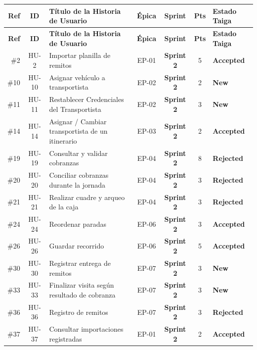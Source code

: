 \documentclass[a4paper,9pt]{article}
\begin{document}
\scriptsize
\begin{longtable}{r c p{8.2cm} c c c l}
\toprule
\textbf{Ref} & \textbf{ID} & \textbf{Título de la Historia de Usuario} & \textbf{Épica} & \textbf{Sprint} & \textbf{Pts} & \textbf{Estado Taiga} \\
\midrule
\endfirsthead
\toprule
\textbf{Ref} & \textbf{ID} & \textbf{Título de la Historia de Usuario} & \textbf{Épica} & \textbf{Sprint} & \textbf{Pts} & \textbf{Estado Taiga} \\
\midrule
\endhead
\bottomrule
\endfoot
\#2 & HU-2 & Importar planilla de remitos & EP-01 & \textbf{Sprint 2} & 5 & \textcolor{tealstatus}{\textbf{Accepted}} \\
\#10 & HU-10 & Asignar vehículo a transportista & EP-02 & \textbf{Sprint 2} & 2 & \textcolor{bluestatus}{\textbf{New}} \\
\#11 & HU-11 & Restablecer Credenciales del Transportista & EP-02 & \textbf{Sprint 2} & 3 & \textcolor{bluestatus}{\textbf{New}} \\
\#14 & HU-14 & Asignar / Cambiar transportista de un itinerario & EP-03 & \textbf{Sprint 2} & 2 & \textcolor{tealstatus}{\textbf{Accepted}} \\
\#19 & HU-19 & Consultar y validar cobranzas & EP-04 & \textbf{Sprint 2} & 8 & \textcolor{redstatus}{\textbf{Rejected}} \\
\#20 & HU-20 & Conciliar cobranzas durante la jornada & EP-04 & \textbf{Sprint 2} & 3 & \textcolor{redstatus}{\textbf{Rejected}} \\
\#21 & HU-21 & Realizar cuadre y arqueo de la caja & EP-04 & \textbf{Sprint 2} & 3 & \textcolor{redstatus}{\textbf{Rejected}} \\
\#24 & HU-24 & Reordenar paradas & EP-06 & \textbf{Sprint 2} & 3 & \textcolor{tealstatus}{\textbf{Accepted}} \\
\#26 & HU-26 & Guardar recorrido & EP-06 & \textbf{Sprint 2} & 5 & \textcolor{tealstatus}{\textbf{Accepted}} \\
\#30 & HU-30 & Registrar entrega de remitos & EP-07 & \textbf{Sprint 2} & 3 & \textcolor{bluestatus}{\textbf{New}} \\
\#33 & HU-33 & Finalizar visita según resultado de cobranza & EP-07 & \textbf{Sprint 2} & 3 & \textcolor{bluestatus}{\textbf{New}} \\
\#36 & HU-36 & Registro de remitos & EP-07 & \textbf{Sprint 2} & 3 & \textcolor{redstatus}{\textbf{Rejected}} \\
\#37 & HU-37 & Consultar importaciones registradas & EP-01 & \textbf{Sprint 2} & 2 & \textcolor{tealstatus}{\textbf{Accepted}} \\

\end{longtable}
\end{document}
